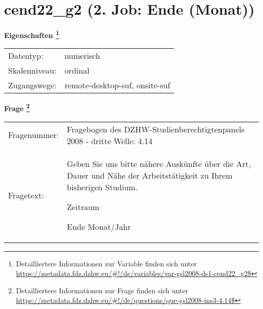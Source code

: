 
    \setcounter{footnote}{0}

    \vspace*{-1.8cm}
	\section{cend22\_g2 (2. Job: Ende (Monat))}
	\label{section:cend22_g2}



    \vspace*{0.5cm}
    \noindent\textbf{Eigenschaften
	\footnote{Detailliertere Informationen zur Variable finden sich unter
		\url{https://metadata.fdz.dzhw.eu/\#!/de/variables/var-gsl2008-ds1-cend22_g2$}}}\\
	\begin{tabularx}{\hsize}{@{}lX}
	Datentyp: & numerisch \\
	Skalenniveau: & ordinal \\
	Zugangswege: &
	  remote-desktop-suf, 
	  onsite-suf
 \\
    \end{tabularx}



				\vspace*{0.5cm}
                \noindent\textbf{Frage
	                \footnote{Detailliertere Informationen zur Frage finden sich unter
		              \url{https://metadata.fdz.dzhw.eu/\#!/de/questions/que-gsl2008-ins3-4.14$}}}\\
				\begin{tabularx}{\hsize}{@{}lX}
					Fragenummer: &
					  Fragebogen des DZHW-Studienberechtigtenpanels 2008 - dritte Welle:
					  4.14
 \\
					Fragetext: & Geben Sie uns bitte nähere Auskünfte über die Art, Dauer und Nähe der Arbeitstätigkeit zu Ihrem bisherigen Studium.\par  Zeitraum\par  Ende Monat/Jahr \\
				\end{tabularx}





